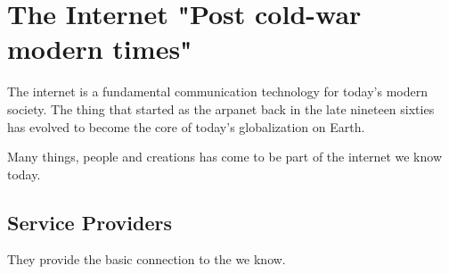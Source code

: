 \chapter[Internet]{The Internet {\footnotesize "Post cold-war modern times"}}

The internet is a fundamental communication technology for today's modern society. The thing that started as the \Gls{arpanet}\cite{wiki:ARPANET} back in the late nineteen sixties has evolved to become the core of today's globalization on Earth.

Many things, people and creations has come to be part of the internet we know today.

\section[SP]{Service Providers}

They provide the basic connection to the  we know.

